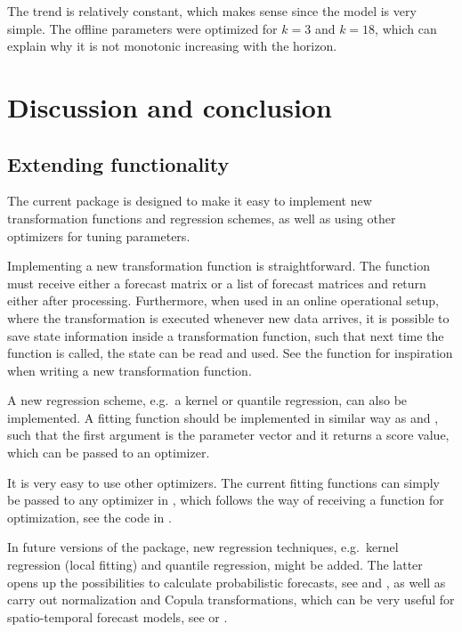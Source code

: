 \noindent The trend is relatively constant, which makes sense since the model is very simple. The offline parameters were optimized for $k=3$
and $k=18$, which can explain why it is not monotonic increasing with the horizon.



\section{Discussion and conclusion} \label{sec:summary}


\subsection{Extending functionality}
The current package is designed to make it easy to implement
new transformation functions and regression schemes, as well as using other
optimizers for tuning parameters.

Implementing a new transformation function is straightforward. The function must receive
either a forecast matrix or a list of forecast matrices and return either after
processing. Furthermore, when used in an online operational setup, where the
transformation is executed whenever new data arrives, it is possible to save state
information inside a transformation function, such that next time the function
is called, the state can be read and used. See the  function for
inspiration when writing a new transformation function.

A new regression scheme, e.g.\ a kernel or quantile regression, can also be
implemented. A fitting function should be implemented in similar way as
 and , such that the first argument is the
parameter vector and it returns a score value, which can be passed to an optimizer.

It is very easy to use other optimizers. The current fitting functions can simply
be passed to any optimizer in \Rprog, which follows the  way of
receiving a function for optimization, see the code in .

In future versions of the package, new regression techniques, e.g.\ kernel regression (local
fitting) and quantile regression, might be added. The latter opens up the
possibilities to calculate probabilistic forecasts, see \citep{nielsen2006using}
and \citep{bjerregoard2021introduction}, as
well as carry out normalization and Copula transformations, which can be very
useful for spatio-temporal forecast models, see \citep{tastu2011spatio} or
\citep{lemos2021probabilistic}.


